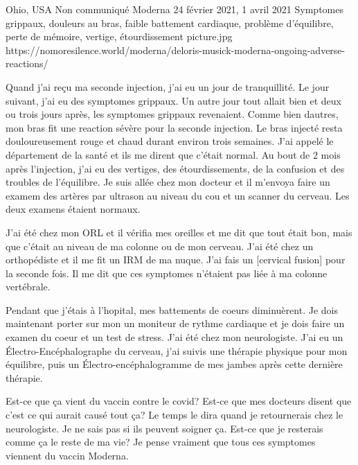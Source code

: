          {Ohio, USA}
          {Non communiqué}
          {Moderna}
          {24 février 2021, 1 avril 2021}
          {Symptomes grippaux, douleurs au bras, faible battement cardiaque, problème d'équilibre, perte de mémoire, vertige, étourdissement}
          {picture.jpg}
          {https://nomoresilence.world/moderna/deloris-musick-moderna-ongoing-adverse-reactions/}
          {

Quand j'ai reçu ma seconde injection, j'ai eu un jour de tranquillité. Le jour
suivant, j'ai eu des symptomes grippaux. Un autre jour tout allait bien et deux
ou trois jours après, les symptomes grippaux revenaient. Comme bien dautres, mon
bras fit une reaction sévère pour la seconde injection. Le bras injecté resta
douloureusement rouge et chaud durant environ trois semaines. J'ai appelé le
département de la santé et ils me dirent que c'était normal. Au bout de 2 mois
après l'injection, j'ai eu des vertiges, des étourdissements, de la confusion et
des troubles de l'équilibre. Je suis allée chez mon docteur et il m'envoya faire
un examem des artères par ultrason au niveau du cou et un scanner du
cerveau. Les deux examens étaient normaux.

J'ai été chez mon ORL et il vérifia mes oreilles et me dit que tout était bon,
mais que c'était au niveau de ma colonne ou de mon cerveau. J'ai été chez un
orthopédiste et il me fit un IRM de ma nuque. J'ai fais un [cervical fusion]
pour la seconde fois. Il me dit que ces symptomes n'étaient pas liée à ma
colonne vertébrale.

Pendant que j'étais à l'hopital, mes battements de coeurs diminuèrent. Je dois
maintenant porter sur mon un moniteur de rythme cardiaque et je dois faire un
examen du coeur et un test de stress. J'ai été chez mon neurologiste. J'ai eu un
Électro-Encéphalographe du cerveau, j'ai suivis une thérapie physique pour mon
équilibre, puis un Électro-encéphalogramme de mes jambes après cette dernière
thérapie.

Est-ce que ça vient du vaccin contre le covid? Est-ce que mes docteurs disent
que c'est ce qui aurait causé tout ça? Le temps le dira quand je retournerais
chez le neurologiste. Je ne sais pas si ils peuvent soigner ça. Est-ce que je
resterais comme ça le reste de ma vie? Je pense vraiment que tous ces symptomes
viennent du vaccin Moderna.

}
